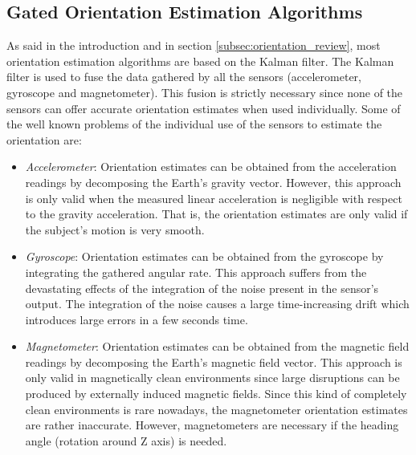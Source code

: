 \documentclass{IOS-Book-Article}
\begin{document}
\subsection{Gated Orientation Estimation Algorithms}
\label{subsec:gated_algorithms}
\indent \indent As said in the introduction and in section \ref{subsec:orientation_review}, most orientation estimation algorithms are based on the Kalman filter. The Kalman filter is used to fuse the data ga\-the\-red by all the sensors (accelerometer, gyroscope and magnetometer). This fusion is strictly necessary since none of the sensors can offer accurate orientation estimates when used individually. Some of the well known problems of the individual use of the sensors to estimate the orientation are:
\begin{itemize}
\item \textit{Accelerometer}: Orientation estimates can be obtained from the acceleration readings by decomposing the Earth's gravity vector. However, this approach is only valid when the measured linear acceleration is negligible with respect to the gravity acceleration. That is, the orientation estimates are only valid if the subject's motion is very smooth.
\item \textit{Gyroscope}: Orientation estimates can be obtained from the gyroscope by integrating the gathered angular rate. This approach suffers from the devastating effects of the integration of the noise present in the sensor's output. The integration of the noise causes a large time-increasing drift which introduces large errors in a few seconds time.
\item \textit{Magnetometer}: Orientation estimates can be obtained from the magnetic field readings by decomposing the Earth's magnetic field vector. This approach is only valid in magnetically clean environments since large disruptions can be produced by externally induced magnetic fields. Since this kind of completely clean environments is rare nowadays, the magnetometer orientation estimates are rather inaccurate. However, magnetometers are necessary if the heading angle (rotation around Z axis) is needed.
\end{itemize}
\end{document}
